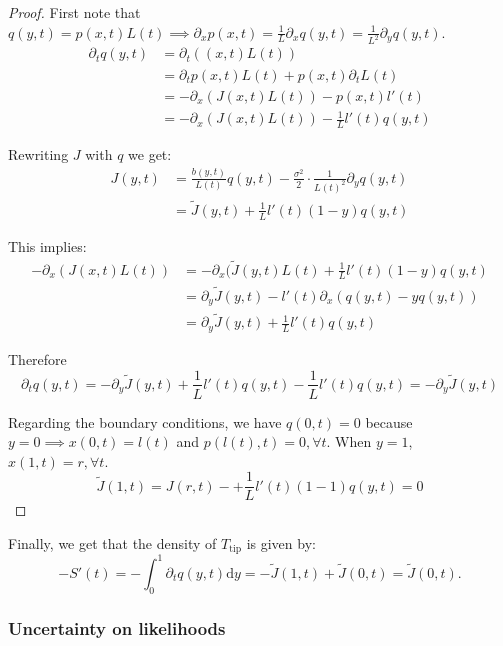 \documentclass[12pt,a4paper]{article}
\theoremstyle{definition}
\theoremstyle{plain}
\newcommand{\dd}{\mathrm{d}}
\newcommand{\Ttip}{T_{\mathrm{tip}}}
\begin{document}
\begin{proof}
First note that $q(y,t) = p(x,t) L(t) \implies \partial_x p(x,t) = \frac{1}{L} \partial_x q(y,t) = \frac{1}{L^2} \partial_y q(y, t)$. \\

\begin{align}
    \partial_t q(y, t) &= \partial_t ((x,t)  L(t)) \\
    &= \partial_t p(x,t)  L(t) + p(x,t)  \partial_t L(t) \\
    &= - \partial_x (J(x,t)  L(t)) - p(x,t)  l'(t) \\
    &= - \partial_x (J(x,t)  L(t)) - \frac{1}{L}l'(t)q(y,t)
\end{align}

Rewriting $J$ with $q$ we get: 
\begin{align}
J(y,t) &= \frac{b(y,t)}{L(t)}q(y,t) - \frac{\sigma^2}{2} \cdot \frac{1}{L(t)^2} \partial_y q(y,t) \\
&= \tilde{J}(y,t) + \frac{1}{L}l'(t)(1-y)q(y,t) 
\end{align}

This implies:
\begin{align}
    - \partial_x(J(x,t) L(t)) &= -\partial_x( \tilde{J}(y,t)L(t) + \frac{1}{L}l'(t)(1-y)q(y,t)  \\
    &= \partial_y \tilde{J}(y,t) - l'(t) \partial_x(q(y,t) - y q(y,t)) \\
    &= \partial_y \tilde{J}(y,t) + \frac{1}{L}l'(t)q(y,t)
\end{align}

Therefore
$$
\partial_t q(y,t) = - \partial_y \tilde{J}(y,t) + \frac{1}{L}l'(t)q(y,t) - \frac{1}{L}l'(t)q(y,t) = - \partial_y \tilde{J}(y,t)
$$

Regarding the boundary conditions, we have $q(0,t) = 0$ because $y=0 \implies x(0,t) = l(t)$ and $p(l(t), t) = 0, \forall t$. When $y=1$, $x(1,t) = r, \forall t$. 
$$
\tilde{J}(1,t) = J(r,t) - + \frac{1}{L}l'(t)(1-1)q(y,t) = 0
$$

    
\end{proof}

\noindent Finally, we get that the density of $\Ttip$ is given by:
$$
- S'(t) = - \int_0^1 \partial_t q(y,t) \dd y = - \tilde{J}(1,t) + \tilde{J}(0,t) = \tilde{J}(0,t).
$$




\subsubsection{Uncertainty on likelihoods}
\label{sec:omega}
\end{document}
